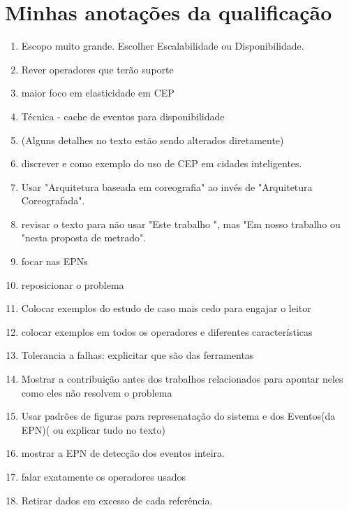 \section{Minhas anotações da qualificação}
\begin{enumerate}
\item Escopo muito grande. Escolher Escalabilidade ou Disponibilidade.
\item Rever operadores que terão suporte
\item maior foco em elasticidade em CEP
\item Técnica - cache de eventos para disponibilidade
\item (Alguns detalhes no texto estão sendo alterados diretamente)
\item discrever \cite{Diniz:2015:RAC:2814058.2814074} e \cite{7916235} como exemplo do uso de CEP em cidades inteligentes.
\item Usar "Arquitetura baseada em coreografia" ao invés de "Arquitetura Coreografada".
\item revisar o texto para não usar "Este trabalho ", mas "Em nosso trabalho ou "nesta proposta de metrado".
\item focar nas EPNs
\item reposicionar o problema
\item Colocar exemplos do estudo de caso mais cedo para engajar o leitor
\item colocar exemplos em todos os operadores e diferentes características
\item Tolerancia a falhas: explicitar que são das ferramentas
\item Mostrar a contribuição antes dos trabalhos relacionados para apontar neles como eles não resolvem o problema
\item Usar padrões de figuras para represenatação do sistema e dos Eventos(da EPN)( ou explicar tudo no texto)
\item mostrar a EPN de detecção dos eventos inteira.
\item falar exatamente os operadores usados
\item Retirar dados em excesso de cada referência.
\end{enumerate}


